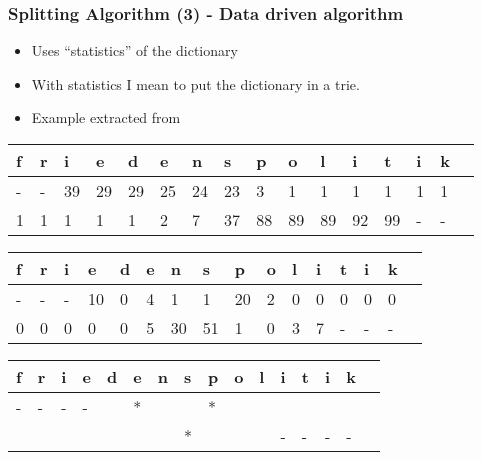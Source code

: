 \documentclass[accentcolor=tud9b, colorbacktitle, inverttitle]{tudbeamer}
\begin{document}
\begin{frame}
  \frametitle{Splitting Algorithm (3) - Data driven algorithm}
\begin{itemize}
  \item Uses ``statistics'' of the dictionary
  \item With statistics I mean to put the dictionary in a trie.
  \item Example extracted from \cite[Martha Larson et al.]{dd}
\end{itemize}

\begin{center}
  \begin{tabular}{|l|l|l|l|l|l|l|l|l|l|l|l|l|l|l|l|}
    \hline
    f&r&i&e&d&e&n&s&p&o&l&i&t&i&k \\ \hline
    -&-&39&29&29&25&24&23&3&1&1&1&1&1&1 \\ \hline
    1&1&1&1&1&2&7&37&88&89&89&92&99&-&- \\ \hline
  \end{tabular}

  \vspace{10pt}

  \begin{tabular}{|l|l|l|l|l|l|l|l|l|l|l|l|l|l|l|l|}
    \hline
    f&r&i&e&d&e&n&s&p&o&l&i&t&i&k \\ \hline
    -&-&-&10&0&4&1&1&20&2&0&0&0&0&0 \\ \hline
    0&0&0&0&0&5&30&51&1&0&3&7&-&-&- \\ \hline
  \end{tabular}

  \vspace{10pt}

  \begin{tabular}{|l|l|l|l|l|l|l|l|l|l|l|l|l|l|l|l|}
    \hline
    f&r&i&e&d&e&n&s&p&o&l&i&t&i&k \\ \hline
    -&-&-&-& &*& & &*& & & & & &  \\ \hline
     & & & & & & &*& & & &-&-&-&- \\ \hline
  \end{tabular}
\end{center}
\end{frame}
\end{document}
